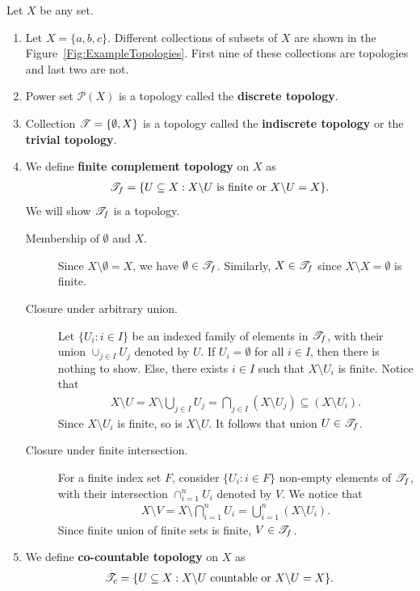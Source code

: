 \documentclass[a4paper,english,12pt]{article}   	%
\begin{document}
\begin{exmp} Let $X$ be any set. 
\begin{enumerate}
	\item Let $X = \{a,b,c\}$. Different collections of subsets of $X$ are shown in the Figure~\ref{Fig:ExampleTopologies}. First nine of these collections are topologies and last two are not.
	\item Power set $\mathcal{P}(X)$ is a topology called the \textbf{discrete topology}.
	\item Collection $\mathscr{T} =\{\emptyset,X\}$ is a topology called the \textbf{indiscrete topology} or the \textbf{trivial topology}.
	\item  We define \textbf{finite complement topology} on $X$ as
	\begin{align*}
	\mathscr{T}_f = \{U \subseteq X : X{\setminus}U \text{ is finite or } X{\setminus}U = X\}. 
	\end{align*}
	We will show $\mathscr{T}_f$ is a topology.
	\begin{description}
		\item[Membership of $\emptyset$ and $X$.] Since $X{\setminus}\emptyset = X$, we have $\emptyset \in \mathscr{T}_f$. Similarly, $X \in \mathscr{T}_f$ since $X{\setminus}X = \emptyset$ is finite. 
		\item[Closure under arbitrary union.] 	Let $\{U_i: i \in I \}$ be an indexed family of elements in $\mathscr{T}_f$, with their union $\cup_{j \in I}U_j$ denoted by $U$. If $U_i = \emptyset$ for all $i \in I$, then there is nothing to show. Else, there exists $i \in I$ such that $X{\setminus}U_i$ is finite.  %
Notice that
\begin{align*}
X{\setminus}U = X\setminus\bigcup_{j \in I}U_j=\bigcap_{j \in {I}}(X\setminus U_j) \subseteq (X\setminus U_i).
\end{align*}
Since $X\setminus U_i$ is finite, so is $X{\setminus}U$. It follows that union $U \in \mathscr{T}_f$. 
	\item[Closure under finite intersection.] For a finite index set $F$, consider $\{U_i: i \in F\}$ non-empty elements of $\mathscr{T}_f$, with their intersection $\cap_{i=1}^{n}U_i$ denoted by $V$. We notice that
\begin{align*} 
X{\setminus}V = X{\setminus}\bigcap_{i = 1}^nU_i=\bigcup_{i = 1}^n(X{\setminus}U_i).
\end{align*}
Since finite union of finite sets is finite, $V \in \mathscr{T}_f$. 
	\end{description}
	\item  We define \textbf{co-countable topology} on $X$ as
	\begin{align*}
	\mathscr{T}_c=\{U \subseteq X: X{\setminus}U \text{ countable or } X{\setminus}U =X \}.
	\end{align*} 
\end{enumerate} 
\end{exmp}
\end{document}
